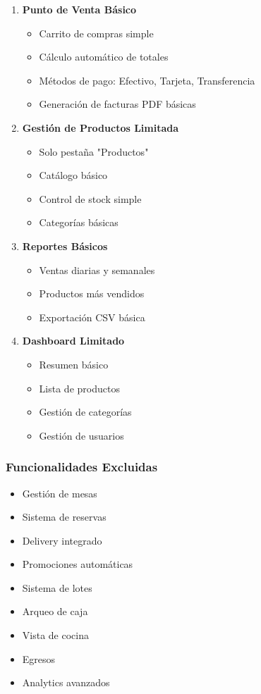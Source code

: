 \documentclass[12pt,a4paper]{article}
\begin{document}
\begin{enumerate}
    \item \textbf{Punto de Venta Básico}
    \begin{itemize}
        \item Carrito de compras simple
        \item Cálculo automático de totales
        \item Métodos de pago: Efectivo, Tarjeta, Transferencia
        \item Generación de facturas PDF básicas
    \end{itemize}
    
    \item \textbf{Gestión de Productos Limitada}
    \begin{itemize}
        \item Solo pestaña "Productos"
        \item Catálogo básico
        \item Control de stock simple
        \item Categorías básicas
    \end{itemize}
    
    \item \textbf{Reportes Básicos}
    \begin{itemize}
        \item Ventas diarias y semanales
        \item Productos más vendidos
        \item Exportación CSV básica
    \end{itemize}
    
    \item \textbf{Dashboard Limitado}
    \begin{itemize}
        \item Resumen básico
        \item Lista de productos
        \item Gestión de categorías
        \item Gestión de usuarios
    \end{itemize}
\end{enumerate}

\subsubsection{Funcionalidades Excluidas}

\begin{itemize}
    \item Gestión de mesas
    \item Sistema de reservas
    \item Delivery integrado
    \item Promociones automáticas
    \item Sistema de lotes
    \item Arqueo de caja
    \item Vista de cocina
    \item Egresos
    \item Analytics avanzados
\end{itemize}
\end{document}
